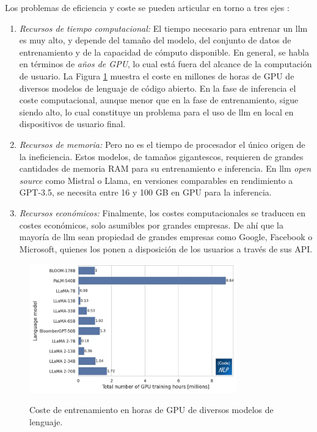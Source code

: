 Los problemas de eficiencia y coste se pueden articular en torno a tres ejes \citep{arunbijiRAGVsFinetuning}:

\begin{enumerate}[label=\alph*)]
    \item \textit{Recursos de tiempo computacional:} El tiempo necesario para entrenar un \gls{llm} es muy alto, y depende del tamaño del modelo, del conjunto de datos de entrenamiento y de la capacidad de cómputo disponible. En general, se habla en términos de \emph{años de GPU}, lo cual está fuera del alcance de la computación de usuario. La Figura \ref{fig:llm_gpu_training_hours} muestra el coste en millones de horas de GPU de diversos modelos de lenguaje de código abierto. En la fase de inferencia el coste computacional, aunque menor que en la fase de entrenamiento, sigue siendo alto, lo cual constituye un problema para el uso de \gls{llm} en local en dispositivos de usuario final.
    \item \textit{Recursos de memoria:} Pero no es el tiempo de procesador el único origen de la ineficiencia. Estos modelos, de tamaños gigantescos, requieren de grandes cantidades de memoria RAM para su entrenamiento e inferencia. En \gls{llm} \emph{open source} como Mistral o Llama, en versiones comparables en rendimiento a GPT-3.5, se necesita entre 16 y 100 GB en GPU para la inferencia. 
    \item \textit{Recursos económicos:} Finalmente, los costes computacionales se traducen en costes económicos, solo asumibles por grandes empresas. De ahí que la mayoría de \gls{llm} sean propiedad de grandes empresas como Google, Facebook o Microsoft, quienes los ponen a disposición de los usuarios a través de sus API.
\end{enumerate}

\begin{figure}[H]
    \caption[Coste de entrenamiento en horas de GPU de diversos modelos de lenguaje]{Coste de entrenamiento en horas de GPU de diversos modelos de lenguaje.}
    \centering
    \includegraphics[width=0.8\textwidth]{./figuras/llm_gpu_training_hours.png}
    \label{fig:llm_gpu_training_hours}
  \end{figure}

